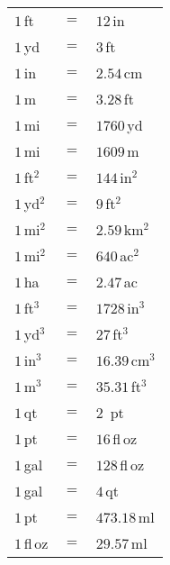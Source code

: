 \documentclass[12pt]{article}
\begin{document}
\bigskip 
\begin{center}
\renewcommand{\arraystretch}{1.5}
\begin{tabular}{L{1.1cm}L{0.8cm}L{1.8cm}}
\toprule
$1$\,ft       & $=$    & $12$\,in \\
$1$\,yd       & $=$    & $3$\,ft \\
$1$\,in       & $=$    & $2.54$\,cm \\
$1$\,m        & $=$    & $3.28$\,ft \\
$1$\,mi       & $=$    & $1760$\,yd \\
$1$\,mi       & $=$    & $1609$\,m \\
\midrule
$1$\,ft$^2$   & $=$    & $144$\,in$^2$ \\
$1$\,yd$^2$   & $=$    & $9$\,ft$^2$ \\
$1$\,mi$^2$   & $=$    & $2.59$\,km$^2$ \\
$1$\,mi$^2$   & $=$    & $640$\,ac$^2$ \\
$1$\,ha       & $=$    & $2.47$\,ac \\
\midrule
$1$\,ft$^3$   & $=$    & $1728$\,in$^3$ \\
$1$\,yd$^3$   & $=$    & $27$\,ft$^3$ \\
$1$\,in$^3$   & $=$    & $16.39$\,cm$^3$ \\
$1$\,m$^3$    & $=$    & $35.31$\,ft$^3$ \\
\midrule
$1$\,qt       & $=$    & $2$~pt \\
$1$\,pt       & $=$    & $16$\,fl\,oz \\
$1$\,gal      & $=$    & $128$\,fl\,oz \\
$1$\,gal      & $=$    & $4$\,qt \\
$1$\,pt       & $=$    & $473.18$\,ml \\
$1$\,fl\,oz   & $=$    & $29.57$\,ml \\
\bottomrule
\end{tabular}
\end{center}

\newpage
\end{document}
